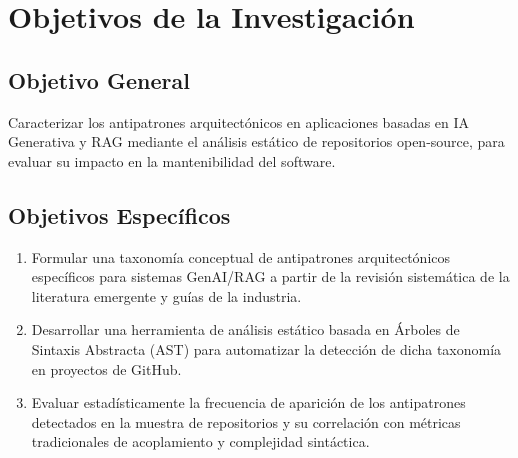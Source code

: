 \section{Objetivos de la Investigación}
 
\subsection{Objetivo General}
 
Caracterizar los antipatrones arquitectónicos en aplicaciones basadas en IA Generativa y RAG mediante el análisis estático de repositorios open-source, para evaluar su impacto en la mantenibilidad del software.
 
\subsection{Objetivos Específicos}
 
\begin{enumerate}
    \item Formular una taxonomía conceptual de antipatrones arquitectónicos específicos para sistemas GenAI/RAG a partir de la revisión sistemática de la literatura emergente y guías de la industria.
    \item Desarrollar una herramienta de análisis estático basada en Árboles de Sintaxis Abstracta (AST) para automatizar la detección de dicha taxonomía en proyectos de GitHub.
    \item Evaluar estadísticamente la frecuencia de aparición de los antipatrones detectados en la muestra de repositorios y su correlación con métricas tradicionales de acoplamiento y complejidad sintáctica.
\end{enumerate}